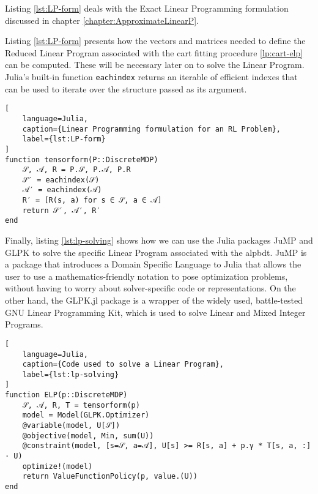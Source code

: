 Listing \ref{lst:LP-form} deals with the Exact Linear Programming formulation
discussed in chapter \ref{chapter:ApproximateLinearP}.

Listing \ref{lst:LP-form} presents how the vectors and matrices needed to define
the Reduced Linear Program associated with the \ac{cart} fitting procedure
\eqref{lp:cart-elp} can be computed. These will be necessary later on to solve
the Linear Program. Julia's built-in function \lstinline{eachindex} returns an
iterable of efficient indexes that can be used to iterate over the structure
passed as its argument.

\begin{lstlisting}[
    language=Julia,
    caption={Linear Programming formulation for an RL Problem},
    label={lst:LP-form}
]
function tensorform(P::DiscreteMDP)
    𝒮, 𝒜, R = P.𝒮, P.𝒜, P.R
    𝒮′ = eachindex(𝒮)
    𝒜′ = eachindex(𝒜)
    R′ = [R(s, a) for s ∈ 𝒮, a ∈ 𝒜]
    return 𝒮′, 𝒜′, R′
end
\end{lstlisting}

Finally, listing \ref{lst:lp-solving} shows how we can use the Julia packages
JuMP and GLPK to solve the specific Linear Program associated with the
\ac{alpbdt}. JuMP is a package that introduces a Domain Specific Language to
Julia that allows the user to use a mathematics-friendly notation to pose
optimization problems, without having to worry about solver-specific code or
representations. On the other hand, the GLPK.jl package is a wrapper of the
widely used, battle-tested GNU Linear Programming Kit, which is used to solve
Linear and Mixed Integer Programs.

\begin{lstlisting}[
    language=Julia,
    caption={Code used to solve a Linear Program},
    label={lst:lp-solving}
]
function ELP(p::DiscreteMDP)
    𝒮, 𝒜, R, T = tensorform(p)
    model = Model(GLPK.Optimizer)
    @variable(model, U[𝒮])
    @objective(model, Min, sum(U))
    @constraint(model, [s=𝒮, a=𝒜], U[s] >= R[s, a] + p.γ * T[s, a, :] · U)
    optimize!(model)
    return ValueFunctionPolicy(p, value.(U))
end
\end{lstlisting}

